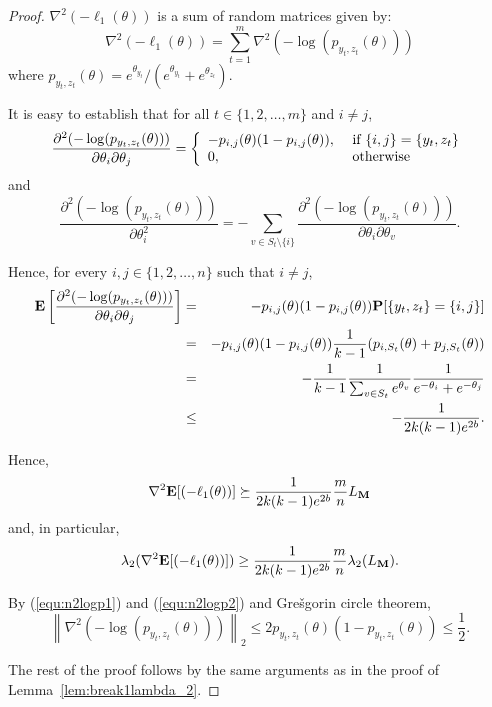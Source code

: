 \begin{proof} $\nabla^2(-\ell_1(\theta))$ is a sum of random matrices given by:
$$
\nabla^2(-\ell_1(\theta)) = \sum_{t=1}^m \nabla^2 \left(-\log(p_{y_t,z_t}(\theta))\right)
$$
where $p_{y_t,z_t}(\theta) = e^{\theta_{y_t}}/(e^{\theta_{y_t}}+e^{\theta_{z_t}})$.

It is easy to establish that for all $t\in \{1,2,\ldots,m\}$ and $i\neq j$,
\begin{equation}
\frac{\partial^2 (-\log(p_{y_t,z_t}(\theta)))}{\partial \theta_i \partial \theta_j} = \left\{
\begin{array}{ll}
-p_{i,j}(\theta)(1-p_{i,j}(\theta)), & \hbox{ if } {\{i,j\} = \{y_t,z_t\}}\\
0, & \hbox{ otherwise}
\end{array}
\right .
\label{equ:n2logp1}
\end{equation}
and
\begin{equation}
\frac{\partial^2 (-\log(p_{y_t,z_t}(\theta)))}{\partial \theta_i^2} = -\sum_{v\in S_t\setminus \{i\}} \frac{\partial^2 (-\log(p_{y_t,z_t}(\theta)))}{\partial \theta_i\partial \theta_v} .
\label{equ:n2logp2}
\end{equation}

Hence, for every $i,j\in \{1,2,\ldots,n\}$ such that $i\neq j$,
\begin{eqnarray*}
  \mathbf{E}\left[ \frac{\partial^2 (-\log(p_{y_t,z_t}(\theta)))}{\partial \theta_i \partial \theta_j}\right] 
	&=& -p_{i,j}(\theta)(1-p_{i,j}(\theta))\mathbf{P}[\{y_t,z_t\}=\{i,j\}]\\
	&=& -p_{i,j}(\theta)(1-p_{i,j}(\theta)) \frac{1}{k-1}(p_{i,S_t}(\theta)+p_{j,S_t}(\theta))\\
	&=& -\frac{1}{k-1}\frac{1}{\sum_{v\in S_t}e^{\theta_v}}\frac{1}{e^{-\theta_i}+e^{-\theta_j}}\\
	& \leq & -\frac{1}{2k(k-1)e^{2b}}.
\end{eqnarray*}

Hence,
$$
\nabla^2 \mathbf{E}[(-\ell_1(\theta))] \succeq \frac{1}{2k(k-1)e^{2b}}\frac{m}{n}L_{\mathbf{M}}
$$
and, in particular,
\begin{equation}
\lambda_2(\nabla^2 \mathbf{E}[(-\ell_1(\theta))]) \geq \frac{1}{2k(k-1)e^{2b}}\frac{m}{n}\lambda_2(L_{\mathbf{M}}).
\label{equ:en2lik1}
\end{equation}

By (\ref{equ:n2logp1}) and (\ref{equ:n2logp2}) and Gre\v sgorin circle theorem,
\begin{equation}
\left\|\nabla^2\left(-\log(p_{y_t,z_t}(\theta))\right) \right\|_2 \leq 2 p_{y_t,z_t}(\theta)(1-p_{y_t,z_t}(\theta)) \leq \frac{1}{2}.
\label{equ:en2lik12}
\end{equation} 

The rest of the proof follows by the same arguments as in the proof of Lemma~\ref{lem:break1lambda_2}.
\end{proof}

